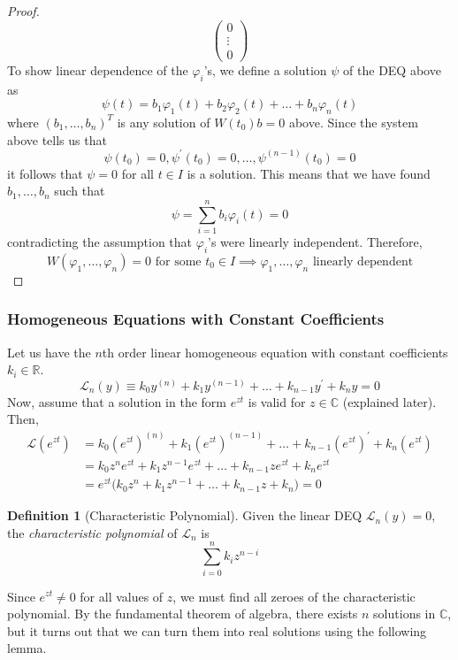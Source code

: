 \documentclass{article}
\theoremstyle{remark}
\theoremstyle{definition}
\newtheorem{definition}{Definition}[section]
\begin{document}
\begin{proof}
\[\begin{pmatrix}
    0 \\ \vdots \\ 0 \end{pmatrix}\]
    To show linear dependence of the $\varphi_i$'s, we define a solution $\psi$ of the DEQ above as
    \[\psi (t) = b_1 \varphi_1 (t) + b_2 \varphi_2 (t) + \ldots + b_n \varphi_n (t)\]
    where $(b_1, \ldots, b_n)^T$ is any solution of $W(t_0) b = 0$ above. Since the system above tells us that
    \[\psi(t_0) = 0, \psi^\prime (t_0) = 0, \ldots, \psi^{(n-1)} (t_0) = 0\]
    it follows that $\psi= 0$ for all $t \in I$ is a solution. This means that we have found $b_1, \ldots, b_n$ such that 
    \[\psi = \sum_{i=1}^n b_i \varphi_i (t) = 0\]
    contradicting the assumption that $\varphi_i$'s were linearly independent. Therefore, 
    \[W(\varphi_1, \ldots, \varphi_n) = 0 \text{ for some } t_0 \in I \implies \varphi_1, \ldots, \varphi_n \text{ linearly dependent}\]
    \end{proof}

    \subsubsection{Homogeneous Equations with Constant Coefficients}

      Let us have the $n$th order linear homogeneous equation with constant coefficients $k_i \in \mathbb{R}$. 
      \[\mathcal{L}_n (y) \equiv k_0 y^{(n)} + k_1 y^{(n-1)} + \ldots + k_{n-1} y^\prime + k_n y = 0\]
      Now, assume that a solution in the form $e^{zt}$ is valid for $z \in \mathbb{C}$ (explained later). Then, 
      \begin{align*}
          \mathcal{L}(e^{zt}) & = k_0 (e^{zt})^{(n)} + k_1 (e^{zt})^{(n-1)} + \ldots + k_{n-1} (e^{zt})^\prime + k_n (e^{zt}) \\
          & = k_0 z^n e^{zt} + k_1 z^{n-1} e^{zt} + \ldots + k_{n-1} z e^{zt} + k_n e^{zt} \\
          & = e^{zt} \big( k_0 z^n + k_1 z^{n-1} + \ldots + k_{n-1} z + k_n \big) = 0
      \end{align*}

      \begin{definition}[Characteristic Polynomial]
      Given the linear DEQ $\mathcal{L}_n (y) = 0$, the \textit{characteristic polynomial} of $\mathcal{L}_n$ is 
      \[\sum_{i=0}^n k_i z^{n-i}\]
      \end{definition}

      Since $e^{zt} \neq 0$ for all values of $z$, we must find all zeroes of the characteristic polynomial. By the fundamental theorem of algebra, there exists $n$ solutions in $\mathbb{C}$, but it turns out that we can turn them into real solutions using the following lemma. 
\end{document}
